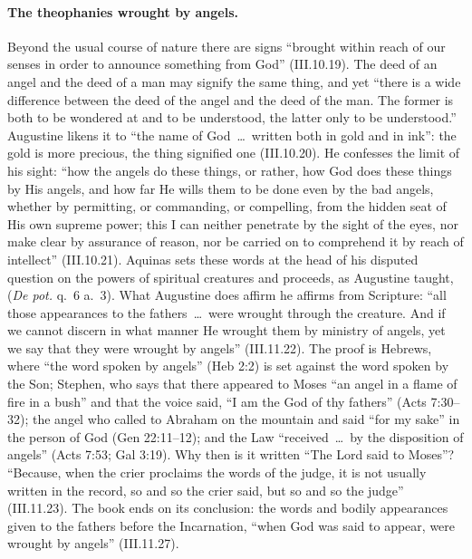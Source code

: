 \paragraph{The theophanies wrought by angels.} Beyond the usual course of
nature there are signs ``brought within reach of our senses in order to
announce something from God'' (III.10.19). The deed of an angel and the
deed of a man may signify the same thing, and yet ``there is a wide
difference between the deed of the angel and the deed of the man. The
former is both to be wondered at and to be understood, the latter only to
be understood.''
Augustine likens it to ``the name of God~\dots\ written both in gold and in
ink'': the gold is more precious, the thing signified one (III.10.20). He
confesses the limit of his sight: ``how the angels do these things, or
rather, how God does these things by His angels, and how far He wills them
to be done even by the bad angels, whether by permitting, or commanding, or
compelling, from the hidden seat of His own supreme power; this I can
neither penetrate by the sight of the eyes, nor make clear by assurance of
reason, nor be carried on to comprehend it by reach of intellect''
(III.10.21). Aquinas sets these words at the head of his disputed question
on the powers of spiritual creatures and proceeds, as Augustine taught,
 (\emph{De
pot.} q.~6 a.~3). What Augustine does affirm he affirms from Scripture:
``all those appearances to the fathers~\dots\ were wrought through the
creature. And if we cannot discern in what manner He wrought them by
ministry of angels, yet we say that they were wrought by angels''
(III.11.22). The proof is Hebrews, where ``the word spoken by angels''
(Heb 2:2) is set against the word spoken by the Son; Stephen, who says that
there appeared to Moses ``an angel in a flame of fire in a bush'' and that
the voice said, ``I am the God of thy fathers'' (Acts 7:30--32); the angel who called to
Abraham on the mountain and said ``for my sake'' in the person of God (Gen
22:11--12); and the Law ``received~\dots\ by the disposition of angels''
(Acts 7:53; Gal 3:19). Why then is it written ``The Lord said to Moses''?
``Because, when the crier proclaims the words of the judge, it is not
usually written in the record, so and so the crier said, but so and so the
judge'' (III.11.23). The book ends on its conclusion: the words and bodily
appearances given to the fathers before the Incarnation, ``when God was
said to appear, were wrought by angels'' (III.11.27).

